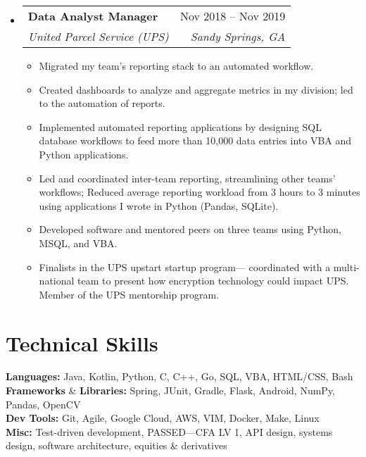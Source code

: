 \documentclass[12pt, a4paper]{article}
\makeatletter
\newcommand{\resumeItem}[1]{
  \item\small{
    {#1 \vspace{-2pt}}
  }
}
\newcommand{\resumeSubheading}[4]{
  \vspace{-2pt}\item
    \begin{tabular*}{0.97\textwidth}[t]{l@{\extracolsep{\fill}}r}
      \textbf{#1} & #2 \\
      \textit{\small#3} & \textit{\small #4} \\
    \end{tabular*}\vspace{-7pt}
}
\newcommand{\resumeSubSubheading}[2]{
    \item
    \begin{tabular*}{0.97\textwidth}{l@{\extracolsep{\fill}}r}
      \textit{\small#1} & \textit{\small #2} \\
    \end{tabular*}\vspace{-7pt}
}
\newcommand{\resumeSubHeadingListStart}{\begin{itemize}[leftmargin=0.15in, label={}]}
\newcommand{\resumeSubHeadingListEnd}{\end{itemize}}
\newcommand{\resumeItemListStart}{\begin{itemize}[noitemsep]} %
\newcommand{\resumeItemListEnd}{\end{itemize}\vspace{-16pt}}
\makeatother
\begin{document}
\resumeSubHeadingListStart
  \resumeSubheading
    {Data Analyst Manager}{Nov 2018 -- Nov 2019}
    {United Parcel Service (UPS)}{Sandy Springs, GA}
    \resumeItemListStart
      \resumeItem{Migrated my team's reporting stack to an automated workflow.}
      \resumeItem{Created dashboards to analyze and aggregate metrics in my division; led to the automation of reports.}
      \resumeItem{Implemented automated reporting applications by designing SQL database workflows to feed more than 10,000 data entries into VBA and Python applications.}
      \resumeItem{Led and coordinated inter-team reporting, streamlining other teams' workflows; Reduced average reporting workload from 3 hours to 3 minutes using applications I wrote in Python (Pandas, SQLite).}
      \resumeItem{Developed software and mentored peers on three teams using Python, MSQL, and VBA.}
      \resumeItem{Finalists in the UPS upstart startup program--- coordinated with a multi-national team to present how encryption technology could impact UPS. Member of the UPS mentorship program.}
    \resumeItemListEnd
    \resumeSubHeadingListEnd

\vspace{2pt}




\section{Technical Skills}
\textbf{Languages:} Java, Kotlin, Python, C, C++, Go, SQL, VBA, HTML/CSS, Bash \\
\textbf{Frameworks} \& \textbf{Libraries:} Spring, JUnit, Gradle, Flask, Android, NumPy, Pandas, OpenCV \\
\textbf{Dev Tools:} Git, Agile, Google Cloud, AWS, VIM, Docker, Make, Linux \\
\textbf{Misc:} Test-driven development, PASSED---CFA LV 1, API design, systems design, software architecture, equities \& derivatives
\end{document}
